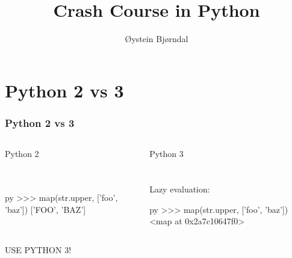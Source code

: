 \documentclass[12pt]{beamer}
\begin{document}

\title{Crash Course in Python}
\author{Øystein Bjørndal}
\begin{frame}[fragile]
\maketitle
\end{frame}

\begin{frame}[fragile]
\tableofcontents
\end{frame}

\section{Python 2 vs 3}
\begin{frame}[fragile]
\frametitle{Python 2 vs 3}
\begin{columns}[T]
	\begin{column}{0.48\textwidth}
Python 2 \\
\vspace{1cm}
\\
\vspace{1cm}
 \\
\vspace{1cm}
\begin{small}
\begin{pygments}{py}
>>> map(str.upper, ['foo', 'baz'])
['FOO', 'BAZ']
\end{pygments}
\end{small}
	\end{column}
	\begin{column}{0.48\textwidth}
Python 3 \\
\vspace{1cm}
\\
\vspace{1cm}
 \\
\vspace{1cm}
Lazy evaluation: \\
\begin{small}
\begin{pygments}{py}
>>> map(str.upper, ['foo', 'baz'])
<map at 0x2a7c10647f0>
\end{pygments}
\end{small}
	\end{column}
\end{columns}

\begin{center}
USE PYTHON 3!
\end{center}
\end{frame}
\end{document}

